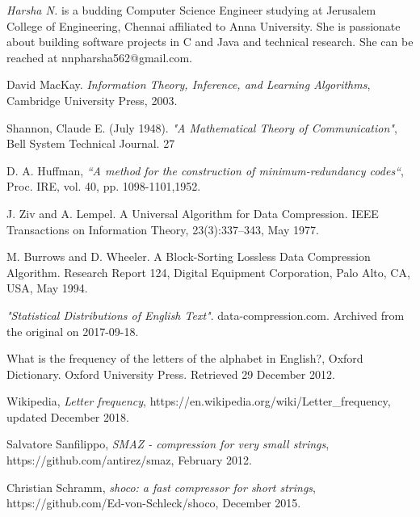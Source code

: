 \documentclass[]{article}
\begin{document}
\emph{Harsha N.} is a budding Computer Science Engineer studying at Jerusalem College of Engineering, Chennai affiliated to Anna University.  She is passionate about building software projects in C and Java and technical research.  She can be reached at nnpharsha562@gmail.com.

\begin{thebibliography}{1}

	 David MacKay. {\em Information Theory, Inference, and Learning Algorithms}, Cambridge University Press, 2003.

	 Shannon, Claude E. (July 1948). {\em"A Mathematical Theory of Communication"}, Bell System Technical Journal. 27
 
	 D. A. Huffman, {\em“A method for the construction of minimum-redundancy codes“}, Proc. IRE, vol. 40, pp. 1098-1101,1952.
 
 	 J. Ziv and A. Lempel. A Universal Algorithm for Data Compression. IEEE Transactions on Information Theory, 23(3):337–343, May 1977.
 
	 M. Burrows and D. Wheeler. A Block-Sorting Lossless Data Compression Algorithm. Research Report 124, Digital Equipment Corporation, Palo Alto, CA, USA, May 1994.

	 {\em "Statistical Distributions of English Text"}. data-compression.com. Archived from the original on 2017-09-18.

 	 What is the frequency of the letters of the alphabet in English?, Oxford Dictionary. Oxford University Press. Retrieved 29 December 2012.

	 Wikipedia, {\em Letter frequency}, https://en.wikipedia.org/wiki/Letter\_frequency, updated December 2018.

 	 Salvatore Sanfilippo, {\em SMAZ - compression for very small strings}, https://github.com/antirez/smaz, February 2012.

 	 Christian Schramm, {\em shoco: a fast compressor for short strings}, https://github.com/Ed-von-Schleck/shoco, December 2015.

\end{thebibliography}
\end{document}
